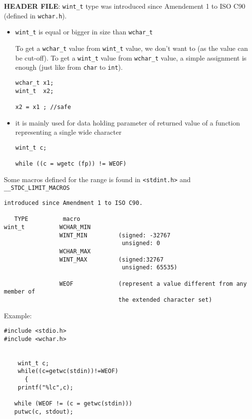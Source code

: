 {\bf HEADER FILE}: \verb!wint_t! type was introduced since Amendement 1
to ISO C90 (defined in \verb!wchar.h!).
\begin{itemize}
   \item \verb!wint_t! is equal or bigger in size than \verb!wchar_t!
   
   To get a \verb!wchar_t! value from \verb!wint_t! value, we don't want to (as
the value can be cut-off). To get a \verb!wint_t! value from \verb!wchar_t! value, a
simple assignment is enough (just like from \verb!char! to \verb!int!).
\begin{verbatim}
wchar_t x1;
wint_t  x2;

x2 = x1 ; //safe
\end{verbatim}

  \item it is mainly used for data holding parameter of returned value of a
  function representing a single wide character

\begin{verbatim}
wint_t c;

while ((c = wgetc (fp)) != WEOF)
\end{verbatim}
\end{itemize}

Some macros defined for the range is found in \verb!<stdint.h>! and
\verb!__STDC_LIMIT_MACROS!
\begin{verbatim}
introduced since Amendment 1 to ISO C90.
                   
   TYPE          macro
wint_t          WCHAR_MIN
                WINT_MIN         (signed: -32767
                                  unsigned: 0                     
                WCHAR_MAX    
                WINT_MAX         (signed:32767
                                  unsigned: 65535)
          
                WEOF             (represent a value different from any member of
                                 the extended character set) 
\end{verbatim}

Example:
\begin{Verbatim}
#include <stdio.h>
#include <wchar.h>


    wint_t c;
    while((c=getwc(stdin))!=WEOF)
      {
    printf("%lc",c);
    
   while (WEOF != (c = getwc(stdin)))
   putwc(c, stdout);
    
\end{Verbatim}


